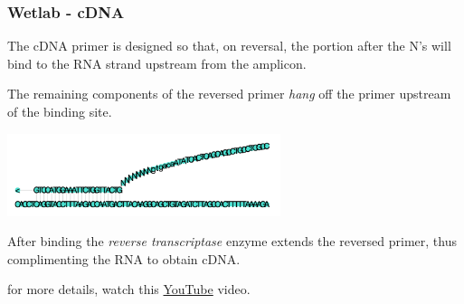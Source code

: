 \documentclass{beamer}
\newcommand{\pdfnarration}[1]{%
\onslide*<\value{beamerpauses}>{\pdfmargincomment[style=note,author=narration]{#1}}%
}
\renewcommand{\pdfnarration}[1]{}
\begin{document}
\begin{frame}[fragile]
\frametitle{ Wetlab -  cDNA  }

\alert<1> 

The cDNA primer is designed so that, on reversal, the portion after the N's will bind to the RNA strand
upstream from the amplicon.  

\bigskip
The remaining components of the reversed primer {\it hang} off the primer
upstream of the binding site.

\begin{center}
\includegraphics[width=8cm]{images/cDNA_primer-binding.png}
\end{center}

After binding the {\it reverse transcriptase} enzyme 
extends the reversed primer, thus complimenting the RNA to obtain cDNA. 


\bigskip
for more details, watch this \href{https://www.youtube.com/watch?v=0MJIbrS4fbQ}{\color{red} YouTube} video.

\pdfnarration{
[[slnc 1000]]
The CDNA primer, is designed so that, on reversal, the portion after the N's will bind to the RNA strand
upstream from the ampli-con.
[[slnc 1000]]
The remaining components hang off the primer, as shown in the diagram.
[[sinc 1000]]
After binding the [[emph +]] reverse-transcriptase-enzyme  [[emph -]] 
extends the primer, thus complimenting the RNA to obtain the CDNA. 
[[sinc 1000]]
}

\end{frame}
\end{document}
